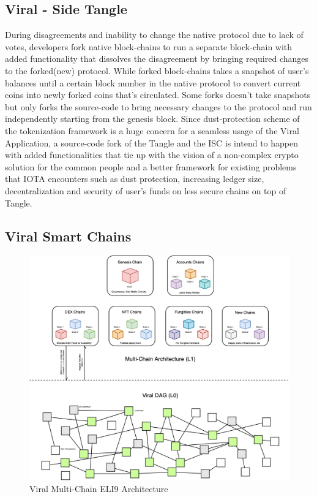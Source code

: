 \documentclass[conference]{IEEEtran}
\begin{document}
\subsection{\textbf{Viral - Side Tangle}}

During disagreements and inability to change the native protocol due to lack of votes, developers fork native block-chains to run a separate block-chain with added functionality that dissolves the disagreement by bringing required changes to the forked(new) protocol. While forked block-chains takes a snapshot of user's balances until a certain block number in the native protocol to convert current coins into newly forked coins that's circulated. Some forks doesn't take snapshots but only forks the source-code to bring necessary changes to the protocol and run independently starting from the genesis block. Since dust-protection scheme of the tokenization framework is a huge concern for a seamless usage of the Viral Application, a source-code fork of the Tangle and the ISC is intend to happen with added functionalities that tie up with the vision of a non-complex crypto solution for the common people and a better framework for existing problems that IOTA encounters such as dust protection, increasing ledger size, decentralization and security of user's funds on less secure chains on top of Tangle.











\subsection{\textbf{Viral Smart Chains}}

\begin{figure}
\begin{center}
\includegraphics[width=14cm]{Architecture}
\caption{Viral Multi-Chain ELI9 Architecture}
\end{center}
\end{figure}
\end{document}
